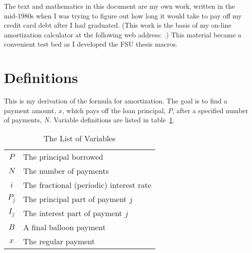 The text and mathematics in this document are my own work, written in
the mid-1980s when I was trying to figure out how long it would take
to pay off my credit card debt after I had graduated.  (This work is
the basis of my on-line amortization calculator at the following
web address:
.)  This
material became a convenient test bed as I developed the FSU thesis
macros.

\section{Definitions}
This is my derivation of the formula for amortization.  The goal is to
find a payment amount, $x$, which pays off the loan principal, $P$,
after a specified number of payments, $N$.  Variable definitions are
listed in table~\ref{tab:varlist}.



\begin{table}[htbp]
\caption{The List of Variables\label{tab:varlist}}
\begin{center}
\begin{tabular}{cl}
$P$&The principal borrowed\\
$N$&The number of payments\\
$i$&The fractional (periodic) interest rate\\
$P_j$&The principal part of payment $j$\\
$I_j$&The interest part of payment $j$\\
$B$&A final balloon payment\\
$x$&The regular payment
\end{tabular}
\end{center}
\end{table}

